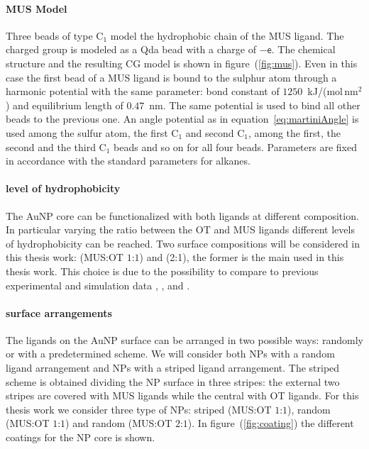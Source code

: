 \paragraph{\textbf{MUS Model}} Three \martini beads of type C$_1$ model the hydrophobic chain of the \ac{MUS} 
ligand. The charged group is modeled as a Qda bead with a charge of $-\mathsf{e}$. The chemical structure and the 
resulting \ac{CG} \martini model is shown in figure~(\ref{fig:mus}). Even in this case the first bead of a 
\ac{MUS} ligand is bound to the sulphur atom through a harmonic potential with the same parameter: bond constant 
of $1250$~kJ/(mol\,nm$^2$) and equilibrium length of $0.47$~nm. The same potential is used to bind all other 
beads to the previous one. An angle potential as in equation~\eqref{eq:martiniAngle} is used among the sulfur 
atom, the first C$_1$ and second C$_1$, among the first, the second and the third C$_1$ beads and so on for all 
four beads. Parameters are fixed in accordance with the standard \martini parameters for alkanes.

\paragraph{\textbf{level of hydrophobicity}} The \ac{AuNP} core can be functionalized with both ligands at 
different composition. In particular varying the ratio between the \ac{OT} and \ac{MUS} ligands different levels 
of hydrophobicity can be reached. Two surface compositions will be considered in this thesis work: 
(\ac{MUS}:\ac{OT} $1$:$1$) and (2:1), the former is the main used in this thesis work. This choice is due to the 
possibility to compare to previous experimental and simulation data \cite{Maccarini2013}, \cite{VanLehn2013}, 
\cite{VanLehn2014} and \cite{VanLehn2015}.

\paragraph{\textbf{surface arrangements}} The ligands on the \ac{AuNP} surface can be arranged in two possible 
ways: randomly or with a predetermined scheme. We will consider both \acp{NP} with a random ligand arrangement 
and \acp{NP} with a striped ligand arrangement. The striped scheme is obtained dividing the \ac{NP} surface in 
three stripes: the external two stripes are covered with \ac{MUS} ligands while the central with \ac{OT} ligands. 
For this thesis work we consider three type of \acp{NP}: striped (\ac{MUS}:\ac{OT} $1$:$1$), random 
(\ac{MUS}:\ac{OT} $1$:$1$) and random (\ac{MUS}:\ac{OT} $2$:$1$). In figure~(\ref{fig:coating}) the different 
coatings for the \ac{NP} core is shown.


